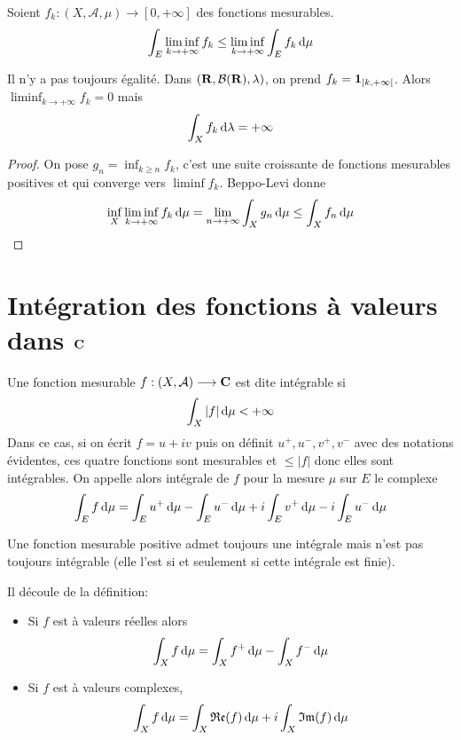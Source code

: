 \begin{lmm}
    Soient $f_k:(X, \mathcal  A, \mu)\longrightarrow [0, +\infty]$ des fonctions mesurables. \[
    \int_E \liminf_{k\to +\infty}f_k\leq \liminf_{k\to +\infty} \int_E f_k\mathop{}\!\mathrm d\mu
    \] 
\end{lmm}


\begin{rem}
    Il n'y a pas toujours égalité. Dans $(\mathbf R, \mathcal B(\mathbf R), \lambda)$, on prend $f_k=\bm{1}_{[k, +\infty[}$. Alors $\liminf_{k\to +\infty} f_k=0$ mais \[
    \int_X f_k\mathop{}\!\mathrm d\lambda=+\infty
    \] 
\end{rem}

\begin{proof}
    On pose $g_n=\inf_{k\geq n}f_k$, c'est une suite croissante de fonctions mesurables positives et qui converge vers $\liminf f_k$. Beppo-Levi donne \[\inf_X\liminf_{k\to +\infty} f_k\mathop{}\!\mathrm d \mu=\lim_{n\to +\infty}\int_Xg_n\mathop{}\!\mathrm d\mu\leq \int_Xf_n\mathop{}\!\mathrm d\mu\]
\end{proof}

\section{Intégration des fonctions à valeurs dans \texorpdfstring{$\mathbf C$}{C}}

\begin{dfn}
    Une fonction mesurable $f:(X, \mathcal  A)\longrightarrow \mathbf C$ est dite intégrable si \[\int_X|f|\mathop{}\!\mathrm d\mu<+\infty\]
    Dans ce cas, si on écrit $f=u+iv$ puis on définit  $u^+, u^-, v^+, v^-$ avec des notations évidentes, ces quatre fonctions sont mesurables et  $\leq |f|$ donc elles sont intégrables. On appelle alors intégrale de $f$ pour la mesure  $\mu$ sur  $E$ le complexe \[\int_Ef\mathop{}\!\mathrm d\mu=\int_Eu^+\mathop{}\!\mathrm d\mu-\int_Eu^-\mathop{}\!\mathrm d\mu+i\int_Ev^+\mathop{}\!\mathrm d\mu-i\int_Eu^-\mathop{}\!\mathrm d\mu\]
\end{dfn}

\begin{rem}[Terminologie]
    Une fonction mesurable positive admet toujours une intégrale mais n'est pas toujours intégrable (elle l'est si et seulement si cette intégrale est finie).
\end{rem}

\begin{rem}
Il découle de la définition: \begin{itemize}
    \item Si $f$ est à valeurs réelles alors \[\int_Xf\mathop{}\!\mathrm d\mu=\int_Xf^+\mathop{}\!\mathrm d\mu-\int_Xf^-\mathop{}\!\mathrm d\mu\] 
    \item Si $f$ est à valeurs complexes, \[\int_X f\mathop{}\!\mathrm d\mu=\int_X\mathfrak{Re}(f)\mathop{}\!\mathrm d\mu+i\int_X\mathfrak{Im}(f)\mathop{}\!\mathrm d\mu\]
\end{itemize}
\end{rem}

